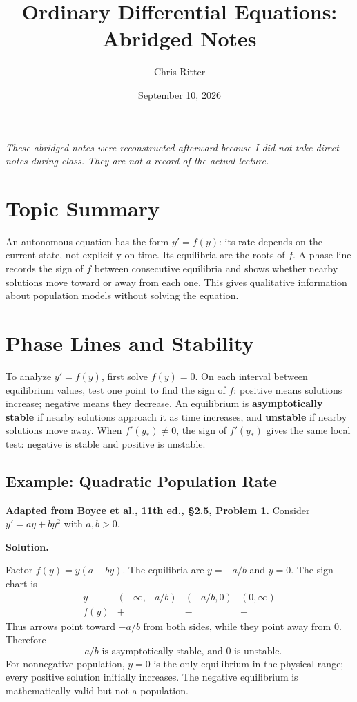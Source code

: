 \documentclass[11pt]{article}
\title{Ordinary Differential Equations: Abridged Notes}
\author{Chris Ritter}
\date{September 10, 2026}
\newenvironment{solution}
    {\par\noindent\textbf{Solution.}\par}
    {\par}
\begin{document}
\maketitle
\begin{center}
\small\emph{These abridged notes were reconstructed afterward because I did not take
direct notes during class. They are not a record of the actual lecture.}
\end{center}
\tableofcontents
\newpage

\section{Topic Summary}
An autonomous equation has the form \(y'=f(y)\): its rate depends on
the current state, not explicitly on time. Its equilibria are the
roots of \(f\). A phase line records the sign of \(f\) between
consecutive equilibria and shows whether nearby solutions move toward
or away from each one. This gives qualitative information about
population models without solving the equation.

\section{Phase Lines and Stability}
To analyze \(y'=f(y)\), first solve \(f(y)=0\). On each interval
between equilibrium values, test one point to find the sign of \(f\):
positive means solutions increase; negative means they decrease.
An equilibrium is \textbf{asymptotically stable} if nearby solutions
approach it as time increases, and \textbf{unstable} if nearby
solutions move away. When \(f'(y_*)\ne0\), the sign of \(f'(y_*)\)
gives the same local test: negative is stable and positive is unstable.

\subsection{Example: Quadratic Population Rate}
\textbf{Adapted from Boyce et al., 11th ed., \S2.5, Problem 1.}
Consider \(y'=ay+by^2\) with \(a,b>0\).
\begin{solution}
Factor \(f(y)=y(a+by)\). The equilibria are \(y=-a/b\) and \(y=0\).
The sign chart is
\[
\begin{array}{c|ccc}
y&(-\infty,-a/b)&(-a/b,0)&(0,\infty)\\\hline
f(y)&+&-&+
\end{array}
\]
Thus arrows point toward \(-a/b\) from both sides, while they point
away from 0. Therefore
\[
\boxed{-a/b\text{ is asymptotically stable, and }0\text{ is unstable}.}
\]
For nonnegative population, \(y=0\) is the only equilibrium in the
physical range; every positive solution initially increases. The
negative equilibrium is mathematically valid but not a population.
\end{solution}
\end{document}
